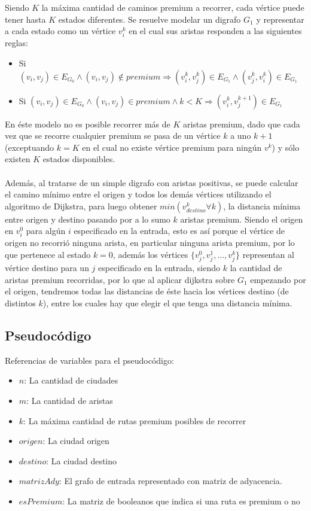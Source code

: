 Siendo $K$ la máxima cantidad de caminos premium a recorrer, cada vértice puede tener hasta $K$ estados diferentes. Se resuelve modelar un digrafo $G_1$ y representar a cada estado como un vértice $v_i^k$ en el cual sus aristas responden a las siguientes reglas:
\begin{itemize}
	\item Si $(v_i,v_j) \in E_{G_0} \land (v_i,v_j) \notin premium \Rightarrow (v_i^k,v_j^k) \in E_{G_1} \land (v_j^k,v_i^k) \in E_{G_1}$
	\item Si $(v_i,v_j) \in E_{G_0} \land (v_i,v_j) \in premium \land k < K \Rightarrow (v_i^k,v_j^{k+1}) \in E_{G_1}$
\end{itemize}
En éste modelo no es posible recorrer más de $K$ aristas premium, dado que cada vez que se recorre cualquier premium se pasa de un vértice $k$ a uno $k+1$ (exceptuando $k=K$ en el cual no existe vértice premium para ningún $v^k$) y sólo existen $K$ estados disponibles.\\\\
Además, al tratarse de un simple digrafo con aristas positivas, se puede calcular el camino mínimo entre el origen y todos los demás vértices utilizando el algoritmo de Dijkstra, para luego obtener $min(v_{destino}^k \forall k)$, la distancia mínima entre origen y destino pasando por a lo sumo $k$ aristas premium. Siendo el origen en $v_i^0$ para algún $i$ especificado en la entrada, esto es así porque el vértice de origen no recorrió ninguna arista, en particular ninguna arista premium, por lo que pertenece al estado $k=0$, además los vértices $\{v_j^0,v_j^1,...,v_j^k\}$ representan al vértice destino para un $j$ especificado en la entrada, siendo $k$ la cantidad de aristas premium recorridas, por lo que al aplicar dijkstra sobre $G_1$ empezando por el origen, tendremos todas las distancias de éste hacia los vértices destino (de distintos $k$), entre los cuales hay que elegir el que tenga una distancia mínima. \\

\subsection{Pseudocódigo}

Referencias de variables para el pseudocódigo:

\begin{itemize}
	\item $n$: La cantidad de ciudades
	\item $m$: La cantidad de aristas
	\item $k$: La máxima cantidad de rutas premium posibles de recorrer
	\item $origen$: La ciudad origen
	\item $destino$: La ciudad destino
	\item $matrizAdy$: El grafo de entrada representado con matriz de adyacencia.
	\item $esPremium$: La matriz de booleanos que indica si una ruta es premium o no
\end{itemize}

